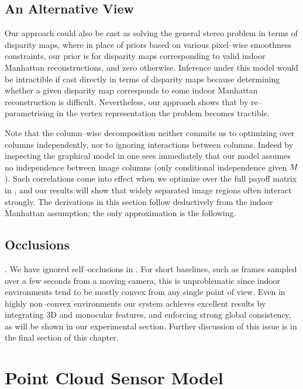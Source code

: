 \subsection{An Alternative View}

Our approach could also be cast as solving the general stereo problem
in terms of disparity maps, where in place of priors based on various
pixel--wise smoothness constraints, our prior is 
for disparity maps corresponding to valid indoor Manhattan
reconstructions, and zero otherwise. Inference under this model would
be intractible if cast directly in terms of disparity maps because
determining whether a given disparity map corresponds to some indoor
Manhattan reconstruction is difficult. Nevertheless, our approach
shows that by re--parametrising in the vertex representation
 the problem becomes tractible.

Note that the column--wise decomposition 
neither commits us to optimizing over columns independently, nor to
ignoring interactions between columns. Indeed by inspecting the
graphical model in  one sees immediately that our
model assumes no independence between image columns (only conditional
independence given $\Scene$). Such correlations come into effect when
we optimize over the full payoff matrix in , and
our results will show that widely separated image regions often
interact strongly. The derivations in this section follow deductively
from the indoor Manhattan assumption; the only approximation is the
following.

\subsection{Occlusions}. We have ignored self--occlusions in
. For short baselines, such as frames
sampled over a few seconds from a moving camera, this is unproblematic
since indoor environments tend to be mostly convex from any single
point of view. Even in highly non--convex environments our system
achieves excellent results by integrating 3D and monocular features,
and enforcing strong global consistency, as will be shown in
our experimental section. Further discussion of this issue is in the
final section of this chapter.

\section{Point Cloud Sensor Model}


